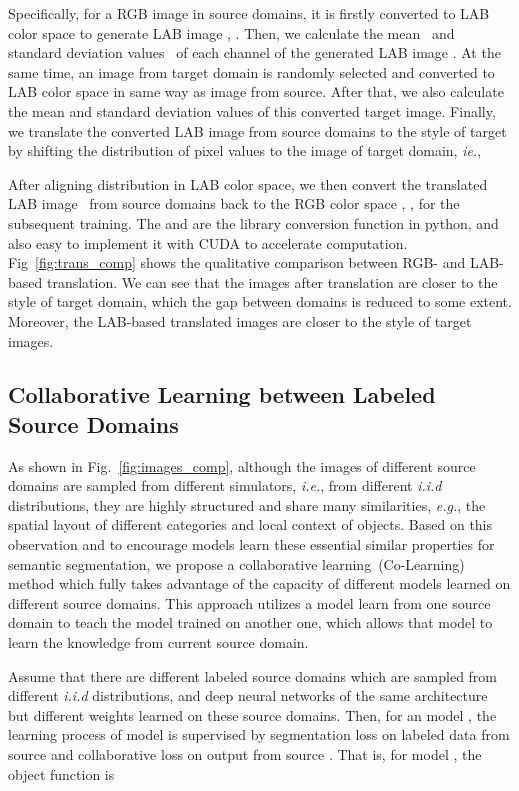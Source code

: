 \documentclass[final]{cvpr}
\def\ie{\textit{i.e.}}
\def\eg{\textit{e.g.}}
\begin{document}
Specifically, for a RGB image  in source domains, it is firstly converted to LAB color space to generate LAB image , . Then, we calculate the mean~ and standard deviation values~ of each channel of the generated LAB image . At the same time, an image from target domain is randomly selected and converted to LAB color space in same way as image from source. After that, we also calculate the mean  and standard deviation values  of this converted target image. Finally, we translate the converted LAB image from source domains to the style of target by shifting the distribution of pixel values to the image of target domain, \textit{ie.},


After aligning distribution in LAB color space, we then convert the translated LAB image~  from source domains back to the RGB color space , , for the subsequent training. The  and  are the library conversion function in python, and also easy to implement it with CUDA to accelerate computation. Fig~\ref{fig:trans_comp} shows the qualitative comparison between RGB- and LAB-based translation. We can see that the images after translation are closer to the style of target domain, which the gap between domains is reduced to some extent. Moreover, the LAB-based translated images are closer to the style of target images.


\subsection{Collaborative Learning between Labeled Source Domains}

As shown in Fig.~\ref{fig:images_comp}, although the images of different source domains are sampled from different simulators, \ie, from different \textit{i.i.d} distributions, they are highly structured and share many similarities, \eg, the spatial layout of different categories and local context of objects. Based on this observation and to encourage models learn these essential similar properties for semantic segmentation, we propose a collaborative learning~(Co-Learning) method which fully takes advantage of the capacity of different models learned on different source domains. This approach utilizes a model learn from one source domain to teach the model trained on another one, which allows that model to learn the knowledge from current source domain. 

Assume that there are  different labeled source domains  which are sampled from  different \textit{i.i.d} distributions, and  deep neural networks  of the same architecture but different weights learned on these source domains. Then, for an model , the learning process of model  is supervised by segmentation loss on labeled data from source  and collaborative loss on output from source . That is, for model , the object function is 
\end{document}
